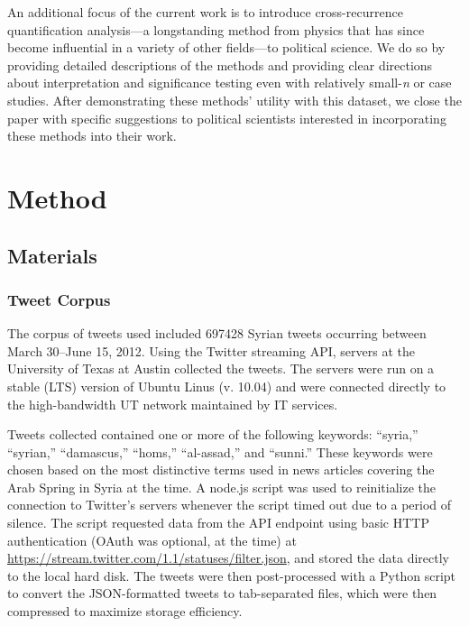 \documentclass[
  english,
  man]{apa6}
\begin{document}
An additional focus of the current work is to introduce cross-recurrence
quantification analysis---a longstanding method from physics that has since
become influential in a variety of other fields---to political science. We do so
by providing detailed descriptions of the methods and providing clear directions
about interpretation and significance testing even with relatively small-\emph{n} or
case studies. After demonstrating these methods' utility with this dataset, we
close the paper with specific suggestions to political scientists interested in
incorporating these methods into their work.

\hypertarget{method}{%
\section{Method}\label{method}}

\hypertarget{materials}{%
\subsection{Materials}\label{materials}}

\hypertarget{tweet-corpus}{%
\subsubsection{Tweet Corpus}\label{tweet-corpus}}

The corpus of tweets used included 697428 Syrian tweets
occurring between March 30--June 15, 2012. Using the Twitter streaming API,
servers at the University of Texas at Austin collected the tweets. The servers
were run on a stable (LTS) version of Ubuntu Linus (v. 10.04) and were connected
directly to the high-bandwidth UT network maintained by IT services.

Tweets collected contained one or more of the following keywords: \enquote{syria,}
\enquote{syrian,} \enquote{damascus,} \enquote{homs,} \enquote{al-assad,} and \enquote{sunni.} These keywords were
chosen based on the most distinctive terms used in news articles covering the
Arab Spring in Syria at the time. A node.js script was used to reinitialize the
connection to Twitter's servers whenever the script timed out due to a period of
silence. The script requested data from the API endpoint using basic HTTP
authentication (OAuth was optional, at the time) at
\url{https://stream.twitter.com/1.1/statuses/filter.json}, and stored the data
directly to the local hard disk. The tweets were then post-processed with a
Python script to convert the JSON-formatted tweets to tab-separated files, which
were then compressed to maximize storage efficiency.
\end{document}

